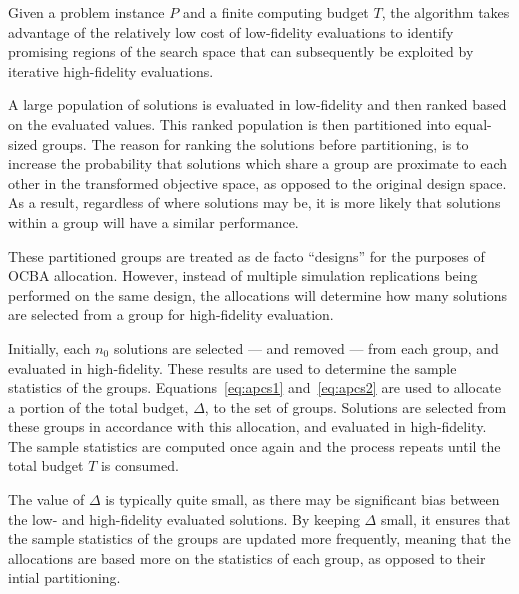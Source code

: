 Given a problem instance $P$ and a finite computing budget $T$, the \motos{} algorithm takes advantage of the relatively low cost of low-fidelity evaluations to identify promising regions of the search space that can subsequently be exploited by iterative high-fidelity evaluations.

A large population of solutions is evaluated in low-fidelity and then ranked based on the evaluated values. This ranked population is then partitioned into equal-sized groups. The reason for ranking the solutions before partitioning, is to increase the probability that solutions which share a group are proximate to each other in the transformed objective space, as opposed to the original design space. As a result, regardless of where solutions may be, it is more likely that solutions within a group will have a similar performance.

These partitioned groups are treated as de facto ``designs'' for the purposes of OCBA allocation. However, instead of multiple simulation replications being performed on the same design, the allocations will determine how many solutions are selected from a group for high-fidelity evaluation.

Initially, each $n_0$ solutions are selected --- and removed --- from each group, and evaluated in high-fidelity. These results are used to determine the sample statistics of the groups. Equations~\ref{eq:apcs1} and~\ref{eq:apcs2} are used to allocate a portion of the total budget, $\Delta$, to the set of groups. Solutions are selected from these groups in accordance with this allocation, and evaluated in high-fidelity. The sample statistics are computed once again and the process repeats until the total budget $T$ is consumed. 

The value of $\Delta$ is typically quite small, as there may be significant bias between the low- and high-fidelity evaluated solutions. By keeping $\Delta$ small, it ensures that the sample statistics of the groups are updated more frequently, meaning that the allocations are based more on the statistics of each group, as opposed to their intial partitioning.

